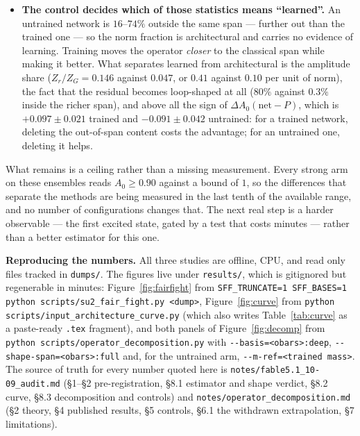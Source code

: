 \documentclass[11pt,a4paper]{article}
\newcommand{\Azero}{A_0}
\newcommand{\dAzero}{\Delta A_0}
\begin{document}
\begin{itemize}
        the entire advantage ($+0.097 \pm 0.021$ against the strong span, at
        unchanged mass); $80\%$ of it is rectangular Wilson loops the network
        rediscovered, leaving $\approx2.5\%$ of the operator's norm that no
        member of a $21$-operator basis expresses and that still carries
        $+0.021 \pm 0.009$. Alone the residual is a poor operator
        ($\Azero \approx 0.42$--$0.46$): it wins by constructive interference,
        carrying about twice the amplitude share its norm share would
        suggest.
  \item \textbf{The control decides which of those statistics means
        ``learned''.} An untrained network is $16$--$74\%$ outside the same span
        --- further out than the trained one --- so the norm fraction is
        architectural and carries no evidence of learning. Training moves the
        operator \emph{closer} to the classical span while making it better.
        What separates learned from architectural is the amplitude share
        ($Z_r/Z_G = 0.146$ against $0.047$, or $0.41$ against $0.10$ per unit of
        norm), the fact that the residual becomes loop-shaped at all ($80\%$
        against $0.3\%$ inside the richer span), and above all the sign of
        $\dAzero(\text{net}-P)$, which is $+0.097 \pm 0.021$ trained and
        $-0.091 \pm 0.042$ untrained: for a trained network, deleting the
        out-of-span content costs the advantage; for an untrained one, deleting
        it helps.
\end{itemize}

What remains is a ceiling rather than a missing measurement. Every strong arm on
these ensembles reads $\Azero \ge 0.90$ against a bound of $1$, so the
differences that separate the methods are being measured in the last tenth of
the available range, and no number of configurations changes that. The next real
step is a harder observable --- the first excited state, gated by a test that
costs minutes --- rather than a better estimator for this one.

\vfill
\footnotesize
\noindent\textbf{Reproducing the numbers.} All three studies are offline, CPU,
and read only files tracked in \texttt{dumps/}. The figures live under
\texttt{results/}, which is gitignored but regenerable in minutes:
Figure~\ref{fig:fairfight} from
\texttt{SFF\_TRUNCATE=1 SFF\_BASES=1 python scripts/su2\_fair\_fight.py <dump>},
Figure~\ref{fig:curve} from \texttt{python scripts/input\_architecture\_curve.py}
(which also writes Table~\ref{tab:curve} as a paste-ready \texttt{.tex}
fragment), and both panels of Figure~\ref{fig:decomp} from
\texttt{python scripts/operator\_decomposition.py} with
\texttt{-{}-basis=<obars>:deep}, \texttt{-{}-shape-span=<obars>:full} and, for
the untrained arm, \texttt{-{}-m-ref=<trained mass>}. The source of truth for
every number quoted here is \texttt{notes/fable5.1\_10-09\_audit.md}
(\S1--\S2 pre-registration, \S8.1 estimator and shape verdict, \S8.2 curve,
\S8.3 decomposition and controls) and
\texttt{notes/operator\_decomposition.md} (\S2 theory, \S4 published results,
\S5 controls, \S6.1 the withdrawn extrapolation, \S7 limitations).
\end{document}
